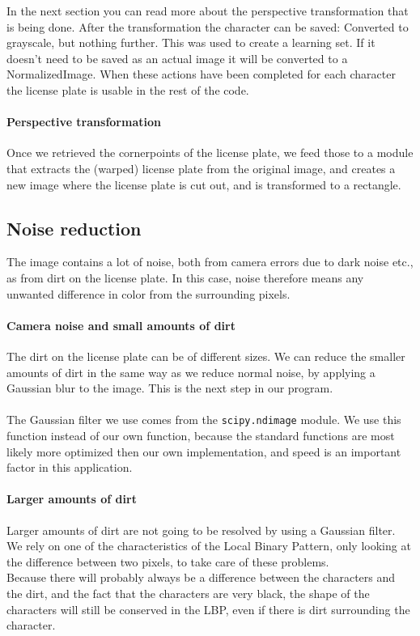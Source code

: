 \documentclass[a4paper]{article}
\begin{document}
In the next section you can read more about the perspective transformation that is being done. After the transformation the
character can be saved: Converted to grayscale, but nothing further. This was used
to create a learning set. If it doesn't need to be saved as an actual image it will be converted
to a NormalizedImage. When these actions have been completed for each character the license
plate is usable in the rest of the code.

\paragraph*{Perspective transformation}
Once we retrieved the cornerpoints of the license plate, we feed those to a
module that extracts the (warped) license plate from the original image, and
creates a new image where the license plate is cut out, and is transformed to a
rectangle.

\subsection{Noise reduction}

The image contains a lot of noise, both from camera errors due to dark noise 
etc., as from dirt on the license plate. In this case, noise therefore means 
any unwanted difference in color from the surrounding pixels.

\paragraph*{Camera noise and small amounts of dirt}
The dirt on the license plate can be of different sizes. We can reduce the 
smaller amounts of dirt in the same way as we reduce normal noise, by applying
a Gaussian blur to the image. This is the next step in our program.\\
\\
The Gaussian filter we use comes from the \texttt{scipy.ndimage} module. We use
this function instead of our own function, because the standard functions are
most likely more optimized then our own implementation, and speed is an
important factor in this application.

\paragraph*{Larger amounts of dirt}
Larger amounts of dirt are not going to be resolved by using a Gaussian filter.
We rely on one of the characteristics of the Local Binary Pattern, only looking
at the difference between two pixels, to take care of these problems.\\
Because there will probably always be a difference between the characters and
the dirt, and the fact that the characters are very black, the shape of the
characters will still be conserved in the LBP, even if there is dirt
surrounding the character.
\end{document}
